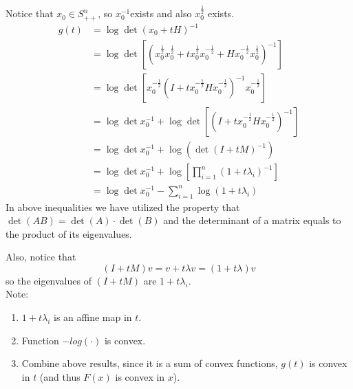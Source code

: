 Notice that $x_0\in S^n_{++}$, so $x_0^{-1}$exists and also $x_0^{\frac{1}{2}}$ exists. 
\begin{align*}
g(t) 
&= \log\det (x_0+tH)^{-1}\\
&= \log\det [(x_0^{\frac{1}{2}}x_0^{\frac{1}{2}}+tx_0^{\frac{1}{2}}x_0^{-\frac{1}{2}}+Hx_0^{-\frac{1}{2}}x_0^{\frac{1}{2}})^{-1}]\\
&= \log\det [x_0^{-\frac{1}{2}}(I+tx_0^{-\frac{1}{2}}Hx_0^{-\frac{1}{2}})^{-1}x_0^{-\frac{1}{2}}]\\
&= \log\det x_0^{-1} + \log\det[(I+tx_0^{-\frac{1}{2}}Hx_0^{-\frac{1}{2}})^{-1}]\\
&= \log\det x_0^{-1}+\log(\det(I+tM)^{-1})\\
&= \log\det x_0^{-1}+\log[\prod^n_{i=1}(1+t\lambda_i)^{-1}]\\
&= \log\det x_0^{-1} - \sum_{i=1}^n\log(1+t\lambda_i)
\end{align*}
In above inequalities we have utilized the property that $\det(AB) = \det(A)\cdot\det(B)$ and the determinant of a matrix equals to the product of its eigenvalues. 

Also, notice that
$$(I+tM)v = v+t\lambda v = (1+t\lambda)v$$
so the eigenvalues of $(I+tM)$ are $1+t\lambda_i$.\\

Note:
\begin{enumerate}
	\item $1+t\lambda_i$ is an affine map in $t$.
	
	\item Function $-log(\cdot)$ is convex.
	
	\item Combine above results, since it is a sum of convex functions, $g(t)$ is convex in $t$ (and thus $F(x)$ is convex in $x$).
\end{enumerate}





